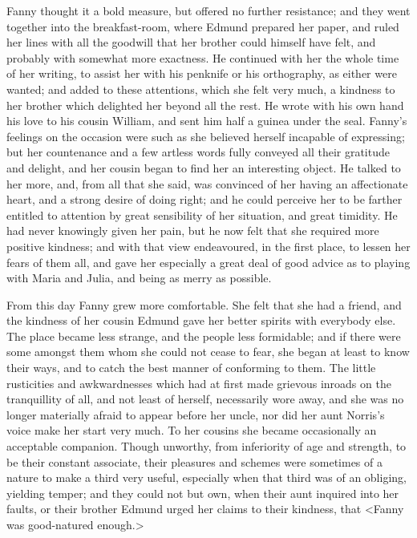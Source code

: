 Fanny thought it a bold measure, but offered no further resistance; and they went together into the breakfast-room, where Edmund prepared her paper, and ruled her lines with all the goodwill that her brother could himself have felt, and probably with somewhat more exactness. He continued with her the whole time of her writing, to assist her with his penknife or his orthography, as either were wanted; and added to these attentions, which she felt very much, a kindness to her brother which delighted her beyond all the rest. He wrote with his own hand his love to his cousin William, and sent him half a guinea under the seal. Fanny's feelings on the occasion were such as she believed herself incapable of expressing; but her countenance and a few artless words fully conveyed all their gratitude and delight, and her cousin began to find her an interesting object. He talked to her more, and, from all that she said, was convinced of her having an affectionate heart, and a strong desire of doing right; and he could perceive her to be farther entitled to attention by great sensibility of her situation, and great timidity. He had never knowingly given her pain, but he now felt that she required more positive kindness; and with that view endeavoured, in the first place, to lessen her fears of them all, and gave her especially a great deal of good advice as to playing with Maria and Julia, and being as merry as possible.

From this day Fanny grew more comfortable. She felt that she had a friend, and the kindness of her cousin Edmund gave her better spirits with everybody else. The place became less strange, and the people less formidable; and if there were some amongst them whom she could not cease to fear, she began at least to know their ways, and to catch the best manner of conforming to them. The little rusticities and awkwardnesses which had at first made grievous inroads on the tranquillity of all, and not least of herself, necessarily wore away, and she was no longer materially afraid to appear before her uncle, nor did her aunt Norris's voice make her start very much. To her cousins she became occasionally an acceptable companion. Though unworthy, from inferiority of age and strength, to be their constant associate, their pleasures and schemes were sometimes of a nature to make a third very useful, especially when that third was of an obliging, yielding temper; and they could not but own, when their aunt inquired into her faults, or their brother Edmund urged her claims to their kindness, that <Fanny was good-natured enough.>

